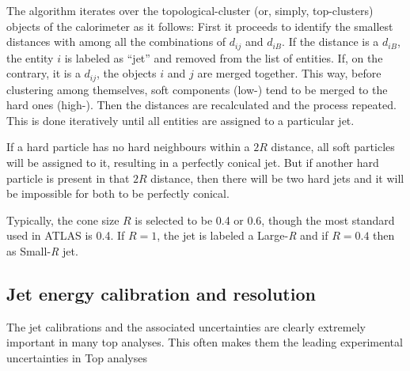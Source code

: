 The algorithm iterates over the topological-cluster (or, simply, top-clusters) objects of the calorimeter as it follows:
First it  proceeds to identify the smallest distances with among all the combinations of $d_{ij}$ and $d_{iB}$.
If the distance is a $d_{iB}$, the entity $i$ is labeled as ``jet'' and removed from the list of entities. 
If, on the contrary, it is a $d_{ij}$, the objects $i$ and $j$ are merged together.  This way, before clustering
among themselves,  soft components  (low-\pT) tend to be merged to the hard ones (high-\pT). 
Then the distances are recalculated and the process repeated. This is done iteratively until all entities are
assigned to a particular jet.

If a hard particle has no hard neighbours within a $2R$ distance, all soft particles will be assigned to it, 
resulting in a perfectly conical jet. But if another hard particle is present in that $2R$ distance, then there
will be two hard jets and it will be impossible for both to be perfectly conical.



Typically,  the cone size $R$ is selected to be 0.4 or 0.6, though the most standard used in ATLAS is 0.4.
If $R=1$, the jet is labeled a Large-\textit{R} and if $R=0.4$ then as Small-\textit{R} jet.



\subsection{Jet energy calibration and resolution}
The jet calibrations and the associated uncertainties are clearly extremely important in many top
analyses.
This often makes them the leading experimental uncertainties in Top analyses

